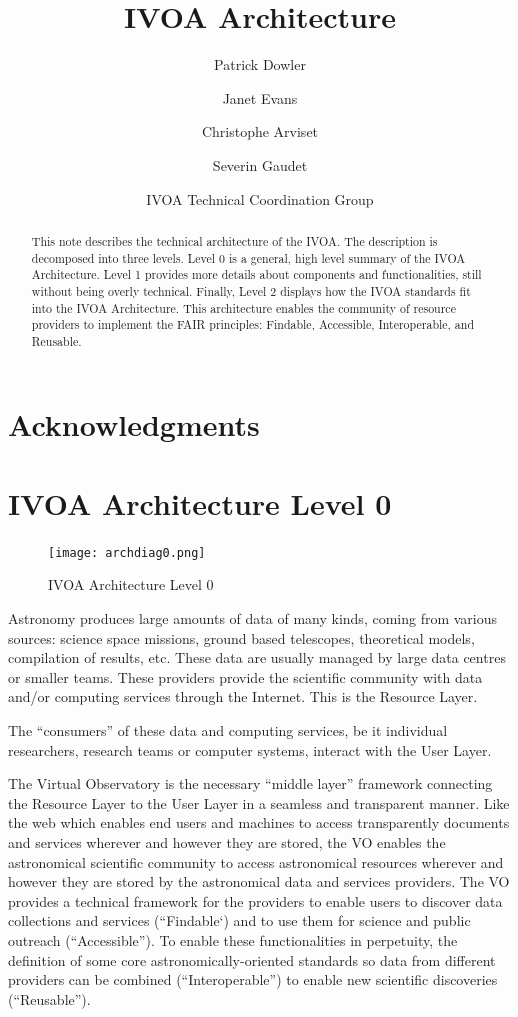 \documentclass[11pt,a4paper]{ivoa}
\title{IVOA Architecture}
\author{Patrick Dowler}
\author{Janet Evans}
\author{Christophe Arviset}
\author{Severin Gaudet}
\author{IVOA Technical Coordination Group}
\begin{document}
\begin{abstract}
This note describes the technical architecture of the IVOA. The description is decomposed 
into three levels. Level 0 is a general, high level summary of the IVOA Architecture. 
Level 1 provides more details about components and functionalities, still without 
being overly technical. Finally, Level 2 displays how the IVOA standards fit into 
the IVOA Architecture. This architecture enables the community of resource providers to
implement the FAIR principles: Findable, Accessible, Interoperable, and Reusable.
\end{abstract}

\section*{Acknowledgments}

\section{IVOA Architecture Level 0}

\begin{figure}[h]
\centering
\texttt{[image: archdiag0.png]}
\caption{IVOA Architecture Level 0}
\label{fig:architecture0}
\end{figure}

Astronomy produces large amounts of data of many kinds, coming from various sources: 
science  space missions, ground based telescopes, theoretical models, compilation of 
results, etc.  These data are usually managed by large data centres or smaller teams. 
These providers provide  the scientific community with data and/or computing services 
through the Internet. This is the Resource Layer. 

The ``consumers'' of these data and computing services, be it individual researchers, 
research teams or computer systems, interact with the User Layer. 

The Virtual Observatory is the necessary ``middle layer'' framework connecting the 
Resource Layer to the User Layer in a seamless and transparent manner. Like the web 
which enables end  users and machines to access transparently documents and services 
wherever and however they are stored, the VO enables the astronomical scientific
community to access astronomical resources wherever and however they are stored by 
the astronomical data and services providers. The VO provides a technical framework 
for the providers to enable users to discover data collections and services 
(``Findable`) and to use them for science and public outreach (``Accessible''). To 
enable these functionalities in perpetuity, the definition of some core astronomically-oriented 
standards so data from different providers can be combined (``Interoperable'') to enable
new scientific discoveries (``Reusable'').
\end{document}
